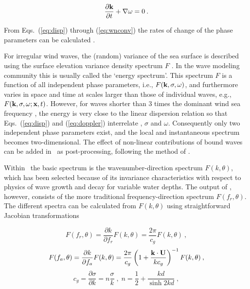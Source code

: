 
\begin{equation}
\frac{\partial {\bk}}{\partial t} + \nabla \omega = 0 \: .
\label{eq:wnconv}
\end{equation}


From Eqs.~(\ref{eq:disp}) through (\ref{eq:wnconv}) the rates of change of the
phase parameters can be calculated \citep[e.g.,][equations not reproduced
here]{rep:Chr82,bk:Mei83,tol:JPO90}.

For irregular wind waves, the (random) variance of
the sea surface is described using the surface elevation variance density spectrum $F$ . In the wave
modeling community this is usually called the  `energy spectrum'. This spectrum
$F$ is a function of all independent phase parameters, i.e.,
$F({\mbox{\bf k}},\sigma,\omega)$, and furthermore varies in space and time at scales
larger than those of individual waves, e.g., $F({\mbox{\bf k}},\sigma,\omega
;\mbox{\bf x},t)$. However, for waves shorter than 3 times the dominant wind sea frequency \citep{Leckler&al.2015}, 
the energy is very close to the linear dispersion relation so that
Eqs.~(\ref{eq:disp}) and (\ref{eq:doppler}) interrelate {\bk}, $\sigma$ and
$\omega$. Consequently only two independent phase parameters exist, and the
local and instantaneous spectrum becomes two-dimensional. The effect of non-linear contributions of 
bound waves can be added in \ws\ as post-processing, following the method of \cite{art:Jan09}.

Within \ws\ the
basic spectrum is the wavenumber-direction spectrum $F(k,\theta)$, which has
been selected because of its invariance characteristics with respect to
physics of wave growth and decay for variable water depths. The output of \ws,
however, consists of the more traditional frequency-direction spectrum
$F(f_r,\theta)$. The different spectra can be calculated from $F(k,\theta)$
using straightforward Jacobian transformations


\begin{equation}
F(f_r,\theta) = \frac{\partial k}{\partial f_r} F(k,\theta) =
\frac{2\pi}{c_g} F(k,\theta) \: ,
\label{eq:jac_fr}
\end{equation}
\begin{equation}
F(f_a,\theta) = \frac{\partial k}{\partial f_a} F(k,\theta) =
\frac{2\pi}{c_g}
\left ( 1 + \frac{{\bk}\cdot{\bf U}}{k c_g}\right )^{-1}
F(k,\theta) \: ,
\label{eq:jac_fa}
\end{equation}
\begin{equation}
c_g = \frac{\partial \sigma}{\partial k} = n \frac{\sigma}{k}
\; , \;
n = \frac{1}{2} + \frac{kd}{\sinh 2kd} \; ,
\label{eq:cg}
\end{equation}

